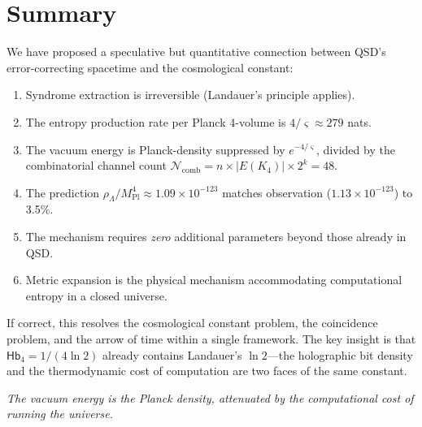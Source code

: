 \documentclass[11pt,a4paper]{article}
\theoremstyle{definition}
\newcommand{\Hb}{\mathsf{Hb}}
\newcommand{\Hbfour}{\Hb_4}
\newcommand{\gs}{\varsigma}                %
\newcommand{\Mpl}{M_{\text{Pl}}}
\newcommand{\rhoL}{\rho_{\Lambda}}
\newcommand{\Ncomb}{\mathcal{N}_{\text{comb}}}
\begin{document}
\section{Summary}

We have proposed a speculative but quantitative connection between QSD's error-correcting spacetime and the cosmological constant:

\begin{enumerate}
    \item Syndrome extraction is irreversible (Landauer's principle applies).
    \item The entropy production rate per Planck 4-volume is $4/\gs \approx 279$ nats.
    \item The vacuum energy is Planck-density suppressed by $e^{-4/\gs}$, divided by the combinatorial channel count $\Ncomb = n \times |E(K_4)| \times 2^k = 48$.
    \item The prediction $\rhoL/\Mpl^4 \approx 1.09 \times 10^{-123}$ matches observation ($1.13 \times 10^{-123}$) to 3.5\%.
    \item The mechanism requires \emph{zero} additional parameters beyond those already in QSD.
    \item Metric expansion is the physical mechanism accommodating computational entropy in a closed universe.
\end{enumerate}

If correct, this resolves the cosmological constant problem, the coincidence problem, and the arrow of time within a single framework. The key insight is that $\Hbfour = 1/(4\ln 2)$ already contains Landauer's $\ln 2$---the holographic bit density and the thermodynamic cost of computation are two faces of the same constant.

\bigskip
\noindent\textit{The vacuum energy is the Planck density, attenuated by the computational cost of running the universe.}
\end{document}

